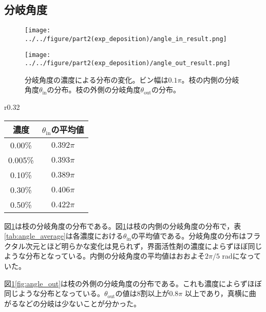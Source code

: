 \documentclass[autodetect-engine,dvi=dvipdfmx,a4paper,ja=standard,oneside,openany,11pt,draft]{bxjsbook}
\begin{document}
\subsection{分岐角度}
\begin{figure}[htbp]
  \begin{minipage}
    {0.45\textwidth}
    \subcaption{}
    \centering
    \texttt{[image: ../../figure/part2(exp\_deposition)/angle\_in\_result.png]}
    \label{fig:angle_in}
  \end{minipage}
  \begin{minipage}
    {0.45\textwidth}
    \subcaption{}
    \centering
    \texttt{[image: ../../figure/part2(exp\_deposition)/angle\_out\_result.png]}
    \label{fig:angle_out}
  \end{minipage}
  \caption{分岐角度の濃度による分布の変化。ビン幅は$0.1\pi$。枝の内側の分岐角度$\theta_{\mathrm{in}}$の分布。枝の外側の分岐角度$\theta_{\mathrm{out}}$の分布。}
  \label{fig:angle}
\end{figure}
\begin{wrapfigure}{r}{0.32\textwidth}
  \centering
  \caption{界面活性剤濃度による$\theta_{\mathrm{in}}$の平均値}
  \begin{tabular}{|c|c|}
    \hline
    濃度      & $\theta_{\mathrm{in}}$の平均値 \\
    \hline\hline
    0.00\%  & $0.392\pi$                 \\ \hline
    0.005\% & $0.393\pi$                 \\ \hline
    0.10\%  & $0.389\pi$                 \\ \hline
    0.30\%  & $0.406\pi$                 \\ \hline
    0.50\%  & $0.422\pi$                 \\
    \hline
  \end{tabular}
  \label{tab:angle_average}
\end{wrapfigure}
図\ref{fig:angle}は枝の分岐角度の分布である。図\ref{fig:angle}は枝の内側の分岐角度の分布で，表\ref{tab:angle_average}は各濃度における$\theta_{\mathrm{in}}$の平均値である。分岐角度の分布はフラクタル次元とほど明らかな変化は見られず，界面活性剤の濃度によらずほぼ同じような分布となっている。内側の分岐角度の平均値はおおよそ$2\pi/5$ radになっていた。

図\ref{fig:angle}\ref{fig:angle_out}は枝の外側の分岐角度の分布である。これも濃度によらずほぼ同じような分布となっている。$\theta_{\mathrm{out}}$の値は8割以上が$0.8\pi$ 以上であり，真横に曲がるなどの分岐は少ないことが分かった。
\end{document}
